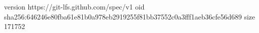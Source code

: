 version https://git-lfs.github.com/spec/v1
oid sha256:646246e80fba61e81b0a978eb2919255f81bb37552c0a3fff1aeb36cfe56d689
size 171752
